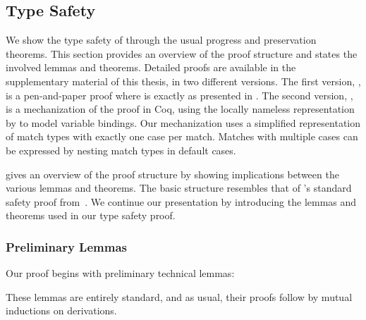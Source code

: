 \subsection{Type Safety}
\label{subsec:type-safety}

We show the type safety of \SystemFm through the usual progress and preservation theorems.
This section provides an overview of the proof structure and states the involved lemmas and theorems.
Detailed proofs are available in the supplementary material of this thesis, in two different versions.
The first version, \cite{blanvillain2021type}, is a pen-and-paper proof where \SystemFm is exactly as presented in .
The second version, \cite{blanvillain2021artifact}, is a mechanization of the proof in Coq,
using the locally nameless representation by \citet{aydemir2008engineering} to model variable bindings.
Our mechanization uses a simplified representation of match types with exactly one case per match.
Matches with multiple cases can be expressed by nesting match types in default cases.


 gives an overview of the proof structure by showing implications between the various lemmas and theorems.
The basic structure resembles that of \SystemFsub's standard safety proof from~\citep{pierce2002types}.
We continue our presentation by introducing the lemmas and theorems used in our type safety proof.

\subsubsection*{Preliminary Lemmas}
Our proof begins with preliminary technical lemmas:
%




%
These lemmas are entirely standard, and as usual, their proofs follow by mutual inductions on derivations.

